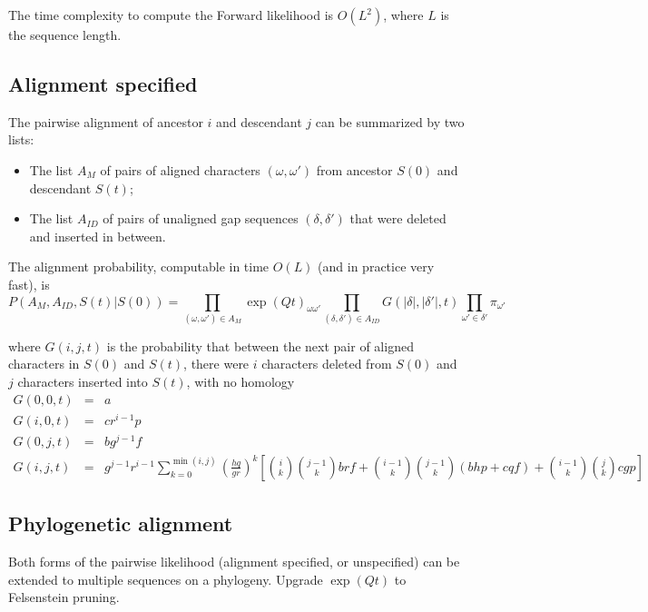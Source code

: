 \documentclass{article}
\begin{document}
The time complexity to compute the Forward likelihood is $O(L^2)$,
where $L$ is the sequence length.

\subsection{Alignment specified}

The pairwise alignment of ancestor $i$ and descendant $j$ can be summarized by two lists:
\begin{itemize}
    \item The list $A_M$ of pairs of aligned characters $(\omega,\omega')$ from ancestor $S(0)$ and descendant $S(t)$;
    \item The list $A_{ID}$ of pairs of unaligned gap sequences $(\delta,\delta')$ that were deleted and inserted in between.
\end{itemize}

The alignment probability, computable in time $O(L)$ (and in practice very fast), is
\[
P(A_M,A_{ID},S(t)|S(0)) =
\prod_{(\omega,\omega') \in A_M} \exp(Qt)_{\omega \omega'}
\prod_{(\delta,\delta') \in A_{ID}} G(|\delta|,|\delta'|,t)
\prod_{\omega'\in \delta'} \pi_{\omega'}
\]

where $G(i,j,t)$ is the probability that between the next pair of aligned characters in $S(0)$ and $S(t)$,
there were $i$ characters deleted from $S(0)$ 
and $j$ characters inserted into $S(t)$,
with no homology
\begin{eqnarray*}
G(0,0,t) & = & a \\
G(i,0,t) & = & cr^{i-1}p \\
G(0,j,t) & = & bg^{j-1}f \\
G(i,j,t) & = &
g^{j-1} r^{i-1}
\sum_{k=0}^{\min(i,j)}
\left(\frac{hq}{gr}\right)^k
\left[
\binom{i}{k} \binom{j-1}{k} brf
+ \binom{i-1}{k} \binom{j-1}{k} (bhp+cqf)
+ \binom{i-1}{k} \binom{j}{k} cgp
\right]
\end{eqnarray*}

\subsection{Phylogenetic alignment}

Both forms of the pairwise likelihood (alignment specified, or unspecified) can be extended to multiple sequences on a phylogeny.
Upgrade $\exp(Qt)$ to Felsenstein pruning. %
\end{document}
